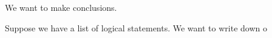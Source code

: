 

We want to make conclusions.


Suppose we have a list of logical statements.
We want to write down o

\blankpage
